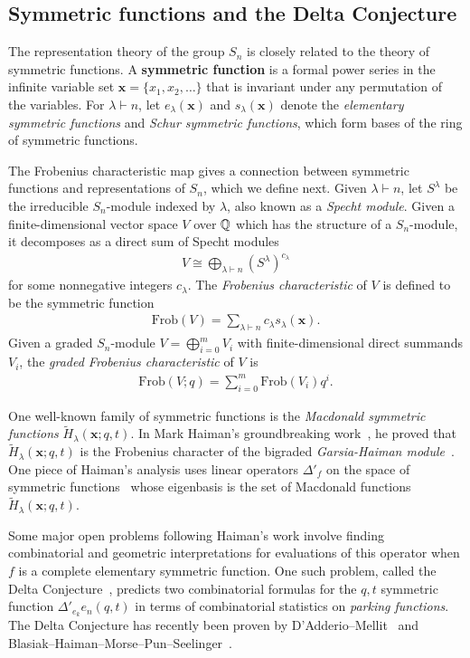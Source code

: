 \documentclass[12pt]{amsart}
\newcommand{\Frob}{\mathrm{Frob}}
\newcommand{\la}{\lambda}
\newcommand{\bx}{\mathbf{x}}
\begin{document}
\subsection{Symmetric functions and the Delta Conjecture}

The representation theory of the group $S_n$ is closely related to the theory of symmetric functions.
A {\bf symmetric function} is a formal power series in the infinite variable set $\bx = \{x_1,x_2,\dots \}$ that is invariant under any permutation of the variables.
For $\la\vdash n$, let $e_\la(\bx)$ and $s_\la(\bx)$ denote the \emph{elementary symmetric functions} and \emph{Schur symmetric functions}, which form bases of the ring of symmetric functions. 

The Frobenius characteristic map gives a connection between symmetric functions and representations of $S_n$, which we define next. Given $\la\vdash n$, let $S^\la$ be the irreducible $S_n$-module indexed by $\la$, also known as a \emph{Specht module}. Given a finite-dimensional vector space $V$ over $\mathbb{Q}$ which has the structure of a $S_n$-module, it decomposes as a direct sum of Specht modules
\begin{align}
V\cong \bigoplus_{\la\vdash n}(S^\la)^{c_\la}
\end{align}
for some nonnegative integers $c_\la$. The \emph{Frobenius characteristic} of $V$ is defined to be the symmetric function
\begin{align}
\Frob(V) = \sum_{\la\vdash n} c_\la s_\la(\bx).
\end{align}
Given a graded $S_n$-module $V = \bigoplus_{i = 0}^m V_i$ with finite-dimensional direct summands $V_i$, the \emph{graded Frobenius characteristic} of $V$ is
\begin{align}
\Frob(V;q) = \sum_{i=0}^m \Frob(V_i)q^i.
\end{align}


One well-known family of symmetric functions is the \emph{Macdonald symmetric functions} $\widetilde H_\lambda(\bx;q,t)$. In Mark Haiman's groundbreaking work~\cite{Haiman01,Haiman02}, he proved that $\widetilde H_\lambda(\bx;q,t)$ is the Frobenius character of the bigraded \emph{Garsia-Haiman module}~\cite{Garsia-Haiman}. 
One piece of Haiman's analysis uses linear operators $\Delta'_f$ on the space of symmetric functions~\cite{BGHT} whose eigenbasis is the set of Macdonald functions $\widetilde H_\lambda(\bx;q,t)$. 

Some major open problems following Haiman's work involve finding combinatorial and geometric interpretations for evaluations of this operator when $f$ is a complete elementary symmetric function.
One such problem, called the Delta Conjecture~\cite{HRW}, predicts two combinatorial formulas for the $q,t$ symmetric function $\Delta'_{e_{k}}e_n(q,t)$
in terms of combinatorial statistics on \emph{parking functions}. 
The Delta Conjecture has recently been proven by D'Adderio--Mellit~\cite{DM} and Blasiak--Haiman--Morse--Pun--Seelinger~\cite{BHMPS}.
\end{document}
